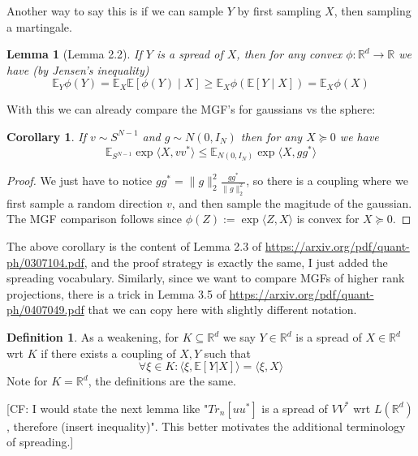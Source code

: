 \documentclass[aos]{imsart}
\newtheorem{corollary}[theorem]{Corollary}
\newtheorem{lemma}[theorem]{Lemma}
\theoremstyle{definition}
\newtheorem{definition}{Definition}
\newcommand{\R}{{\mathbb{R}}}
\newcommand{\E}{\mathbb{E}}
\newcommand{\CF}[1]{{\color{purple}[CF: #1]}}
\begin{document}
Another way to say this is if we can sample $Y$ by first sampling $X$, then sampling a martingale.

\begin{lemma} [Lemma 2.2]
If $Y$ is a spread of $X$, then for any convex $\phi : \R^{d} \to \R$ we have (by Jensen's inequality)
\[ \E_{Y} \phi(Y) = \E_{X} \E [ \phi(Y) \mid X ] \geq \E_{X} \phi(\E[Y \mid X]) = \E_{X} \phi(X)      \]
\end{lemma}

With this we can already compare the MGF's for gaussians vs the sphere:
\begin{corollary}
If $v \sim S^{N-1}$ and $g \sim N(0,I_{N})$ then for any $X \succeq 0$ we have
\[ \E_{S^{N-1}} \exp \langle X, v v^{*} \rangle \leq \E_{N(0,I_{N})} \exp \langle X, g g^{*} \rangle     \]
\end{corollary}
\begin{proof}
We just have to notice $g g^{*} = \|g\|_{2}^{2} \frac{g g^{*}}{\|g\|_{2}^{2}}$, so there is a coupling where we first sample a random direction $v$, and then sample the magitude of the gaussian. The MGF comparison follows since $\phi(Z) := \exp \langle Z, X \rangle$ is convex for $X \succeq 0$.
\end{proof}

The above corollary is the content of Lemma 2.3 of \url{https://arxiv.org/pdf/quant-ph/0307104.pdf}, and the proof strategy is exactly the same, I just added the spreading vocabulary. Similarly, since we want to compare MGFs of higher rank projections, there is a trick in Lemma 3.5 of \url{https://arxiv.org/pdf/quant-ph/0407049.pdf} that we can copy here with slightly different notation.
\begin{definition}
As a weakening, for $K \subseteq \R^{d}$ we say $Y \in \R^{d}$ is a spread of $X \in \R^{d}$ wrt $K$ if
there exists a coupling of $X,Y$ such that
\[ \forall \xi \in K:  \langle \xi, \E[Y |X] \rangle = \langle \xi, X  \rangle   \]
Note for $K = \R^{d}$, the definitions are the same.
\end{definition}
\CF{I would state the next lemma like "$Tr_{n}[u u^{*}]$ is a spread of $V V^{*}$ wrt $L(\R^{d})$, therefore (insert inequality)". This better motivates the additional terminology of spreading.}
\end{document}
